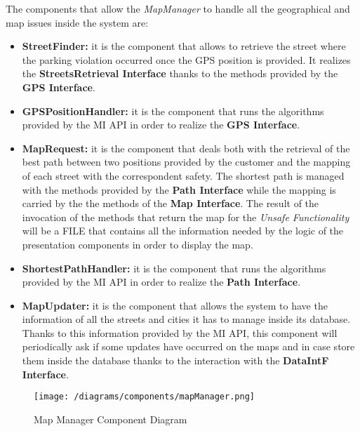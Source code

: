 			The components that allow the \emph{MapManager} to handle all the geographical and map issues inside the system are:
			
			\begin{itemize}
				\item \textbf{StreetFinder:} it is the component that allows to retrieve the street where the parking violation occurred once the GPS position is provided. It realizes the \textbf{StreetsRetrieval Interface} thanks to the methods provided by the \textbf{GPS Interface}.
				
				\item \textbf{GPSPositionHandler:} it is the component that runs the algorithms provided by the MI API in order to realize the \textbf{GPS Interface}.
				
				\item \textbf{MapRequest:} it is the component that deals both with the retrieval of the best path between two positions provided by the customer and the mapping of each street with the correspondent safety. The shortest path is managed with the methods provided by the \textbf{Path Interface} while the mapping is carried by the the methods of the \textbf{Map Interface}. The result of the invocation of the methods that return the map for the \emph{Unsafe Functionality} will be a FILE that contains all the information needed by the logic of the presentation components in order to display the map.
							
				\item \textbf{ShortestPathHandler:} it is the component that runs the algorithms provided by the MI API in order to realize the \textbf{Path Interface}.
				
				\item \textbf{MapUpdater:} it is the component that allows the system to have the information of all the streets and cities it has to manage inside its database. Thanks to this information provided by the MI API, this component will periodically ask if some updates have occurred on the maps and in case store them inside the database thanks to the interaction with the \textbf{DataIntF Interface}.
			\end{itemize}
			
			\begin{figure}[ht]
				\centering
				\texttt{[image: /diagrams/components/mapManager.png]}
				\caption{\label{fig:mapManagerComp} Map Manager Component Diagram}
			\end{figure}
		
